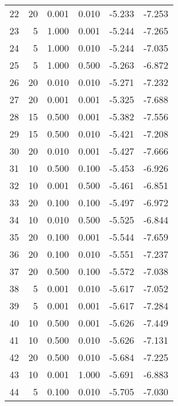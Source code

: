 \begin{tabular}{rrrrrr}
    22 &        20 &  0.001 & 0.010 &                 -5.233 &      -7.253 \\
    23 &         5 &  1.000 & 0.001 &                 -5.244 &      -7.265 \\
    24 &         5 &  1.000 & 0.010 &                 -5.244 &      -7.035 \\
    25 &         5 &  1.000 & 0.500 &                 -5.263 &      -6.872 \\
    26 &        20 &  0.010 & 0.010 &                 -5.271 &      -7.232 \\
    27 &        20 &  0.001 & 0.001 &                 -5.325 &      -7.688 \\
    28 &        15 &  0.500 & 0.001 &                 -5.382 &      -7.556 \\
    29 &        15 &  0.500 & 0.010 &                 -5.421 &      -7.208 \\
    30 &        20 &  0.010 & 0.001 &                 -5.427 &      -7.666 \\
    31 &        10 &  0.500 & 0.100 &                 -5.453 &      -6.926 \\
    32 &        10 &  0.001 & 0.500 &                 -5.461 &      -6.851 \\
    33 &        20 &  0.100 & 0.100 &                 -5.497 &      -6.972 \\
    34 &        10 &  0.010 & 0.500 &                 -5.525 &      -6.844 \\
    35 &        20 &  0.100 & 0.001 &                 -5.544 &      -7.659 \\
    36 &        20 &  0.100 & 0.010 &                 -5.551 &      -7.237 \\
    37 &        20 &  0.500 & 0.100 &                 -5.572 &      -7.038 \\
    38 &         5 &  0.001 & 0.010 &                 -5.617 &      -7.052 \\
    39 &         5 &  0.001 & 0.001 &                 -5.617 &      -7.284 \\
    40 &        10 &  0.500 & 0.001 &                 -5.626 &      -7.449 \\
    41 &        10 &  0.500 & 0.010 &                 -5.626 &      -7.131 \\
    42 &        20 &  0.500 & 0.010 &                 -5.684 &      -7.225 \\
    43 &        10 &  0.001 & 1.000 &                 -5.691 &      -6.883 \\
    44 &         5 &  0.100 & 0.010 &                 -5.705 &      -7.030 \\

\end{tabular}
